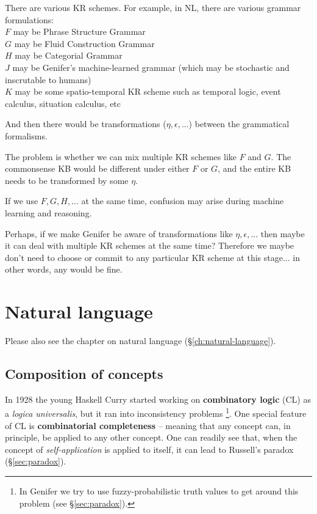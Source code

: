 There are various KR schemes.  For example, in NL, there are various grammar formulations:\\
$F$ may be Phrase Structure Grammar\\
$G$ may be Fluid Construction Grammar\\
$H$ may be Categorial Grammar\\
$J$ may be Genifer's machine-learned grammar (which may be stochastic and inscrutable to humans)\\
$K$ may be some spatio-temporal KR scheme such as temporal logic, event calculus, situation calculus, etc

And then there would be transformations ($\eta, \epsilon, ...$) between the grammatical formalisms.

The problem is whether we can mix multiple KR schemes like $F$ and $G$.  The commonsense KB would be different under either $F$ or $G$, and the entire KB needs to be transformed by some $\eta$.

If we use $F, G, H,...$ at the same time, confusion may arise during machine learning and reasoning.

Perhaps, if we make Genifer be aware of transformations like $\eta, \epsilon, ...$ then maybe it can deal with multiple KR schemes at the same time?  Therefore we maybe don't need to choose or commit to any particular KR scheme at this stage...  in other words, any would be fine.

\section{Natural language}

Please also see the chapter on natural language (\S\ref{ch:natural-language}).

\subsection{Composition of concepts}
\label{sec:composition}

In 1928 the young Haskell Curry started working on \textbf{combinatory logic} (CL) as a \textit{logica universalis}, but it ran into inconsistency problems \footnote{In Genifer we try to use fuzzy-probabilistic truth values to get around this problem (see \S\ref{sec:paradox}).}.  One special feature of CL is \textbf{combinatorial completeness} -- meaning that any concept can, in principle, be applied to any other concept.  One can readily see that, when the concept of \textit{self-application} is applied to itself, it can lead to Russell's paradox (\S\ref{sec:paradox}).

